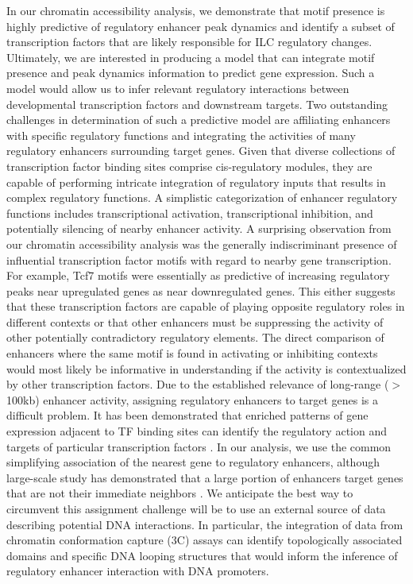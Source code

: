 In our chromatin accessibility analysis, we demonstrate that motif presence is highly predictive of regulatory enhancer peak dynamics and identify a subset of transcription factors that are likely responsible for ILC regulatory changes. Ultimately, we are interested in producing a model that can integrate motif presence and peak dynamics information to predict gene expression. Such a model would allow us to infer relevant regulatory interactions between developmental transcription factors and downstream targets. Two outstanding challenges in determination of such a predictive model are affiliating enhancers with specific regulatory functions and integrating the activities of many regulatory enhancers surrounding target genes. Given that diverse collections of transcription factor binding sites comprise cis-regulatory modules, they are capable of performing intricate integration of regulatory inputs that results in complex regulatory functions. A simplistic categorization of enhancer regulatory functions includes transcriptional activation, transcriptional inhibition, and potentially silencing of nearby enhancer activity. A surprising observation from our chromatin accessibility analysis was the generally indiscriminant presence of influential transcription factor motifs with regard to nearby gene transcription. For example, Tcf7 motifs were essentially as predictive of increasing regulatory peaks near upregulated genes as near downregulated genes. This either suggests that these transcription factors are capable of playing opposite regulatory roles in different contexts or that other enhancers must be suppressing the activity of other potentially contradictory regulatory elements. The direct comparison of enhancers where the same motif is found in activating or inhibiting contexts would most likely be informative in understanding if the activity is contextualized by other transcription factors. Due to the established relevance of long-range ($>$100kb) enhancer activity, assigning regulatory enhancers to target genes is a difficult problem. It has been demonstrated that enriched patterns of gene expression adjacent to TF binding sites can identify the regulatory action and targets of particular transcription factors \cite{Maienschein2011}. In our analysis, we use the common simplifying association of the nearest gene to regulatory enhancers, although large-scale study has demonstrated that a large portion of enhancers target genes that are not their immediate neighbors \cite{Kvon2014}. We anticipate the best way to circumvent this assignment challenge will be to use an external source of data describing potential DNA interactions. In particular, the integration of data from chromatin conformation capture (3C) assays can identify topologically associated domains and specific DNA looping structures that would inform the inference of regulatory enhancer interaction with DNA promoters. 

